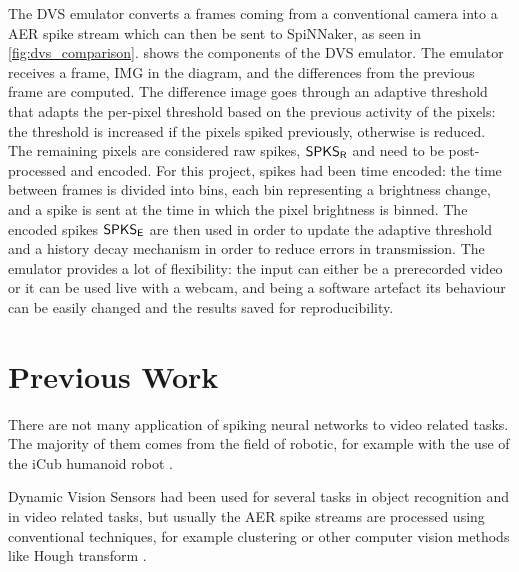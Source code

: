 The DVS emulator converts a frames coming from a conventional camera into a AER spike stream which can then be sent to SpiNNaker, as seen in \cref{fig:dvs_comparison}.  
 shows the components of the DVS emulator. The emulator receives a frame, \textsf{IMG} in the diagram, and the differences from the previous frame are computed. The difference image goes through an adaptive threshold that adapts the per-pixel threshold based on the previous activity of the pixels: the threshold is increased if the pixels spiked previously, otherwise is reduced. The remaining pixels are considered raw spikes, $\text{\textsf{SPKS}}_\text{\textsf{R}}$ and need to be post-processed and encoded. For this project, spikes had been time encoded: the time between frames is divided into bins, each bin representing a brightness change, and a spike is sent at the time in which the pixel brightness is binned. The encoded spikes $\text{\textsf{SPKS}}_\text{\textsf{E}}$ are then used in order to update the adaptive threshold and a history decay mechanism in order to reduce errors in transmission. 
The emulator provides a lot of flexibility: the input can either be a prerecorded video or it can be used live with a webcam, and being a software artefact its behaviour can be easily changed and the results saved for reproducibility. 





\section{Previous Work}
There are not many application of spiking neural networks to video related tasks. The majority of them comes from the field of robotic, for example with the use of the iCub humanoid robot \cite{HernandezGarcia2018}.

Dynamic Vision Sensors had been used for several tasks in object recognition and in video related tasks, but usually the AER spike streams are processed using conventional techniques, for example clustering or other computer vision methods like Hough transform \cite{Glover2016, Glover2017}.